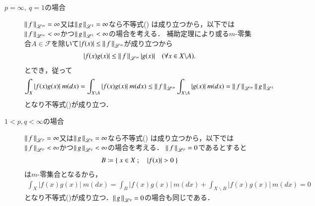 \begin{prf}
	\begin{description}
		\item[$p = \infty,\ q = 1$の場合]
			$\left\|\, f\, \right\|_{\mathscr{L}^\infty} = \infty$又は$\left\|\, g\, \right\|_{\mathscr{L}^1} = \infty$なら不等式()
			は成り立つから，以下では$\left\|\, f\, \right\|_{\mathscr{L}^\infty} < \infty$かつ$\left\|\, g\, \right\|_{\mathscr{L}^1} < \infty$の場合を考える．
			補助定理により或る$m$-零集合$A \in \mathcal{F}$を除いて$|f(x)| \leq \left\|\, f\, \right\|_{\mathscr{L}^\infty}$が成り立つから
			\begin{align}
				|f(x)g(x)| \leq \left\|\, f\, \right\|_{\mathscr{L}^\infty}|g(x)| \quad (\forall x \in X \backslash A).
			\end{align}
			とでき，従って
			\begin{align}
				\int_{X} |f(x)g(x)|\ m(dx) = \int_{X \backslash A} |f(x)g(x)|\ m(dx) \leq \left\|\, f\, \right\|_{\mathscr{L}^\infty} \int_{X \backslash A} |g(x)|\ m(dx) 
				= \left\|\, f\, \right\|_{\mathscr{L}^\infty} \left\|\, g\, \right\|_{\mathscr{L}^1}
			\end{align}
			となり不等式()が成り立つ．
		
		\item[$1 < p,q < \infty$の場合]
			$\left\|\, f\, \right\|_{\mathscr{L}^p} = \infty$又は$\left\|\, g\, \right\|_{\mathscr{L}^q} = \infty$なら不等式()
			は成り立つから，以下では$\left\|\, f\, \right\|_{\mathscr{L}^p} < \infty$かつ$\left\|\, g\, \right\|_{\mathscr{L}^q} < \infty$の場合を考える．
			$\left\|\, f\, \right\|_{\mathscr{L}^p} = 0$であるとすると
			\begin{align}
				B \coloneqq \left\{\ x \in X\ ;\quad |f(x)| > 0\ \right\}
			\end{align}
			は$m$-零集合となるから，
			\begin{align}
				\int_{X} |f(x)g(x)|\ m(dx) = \int_{B} |f(x)g(x)|\ m(dx) + \int_{X \backslash B} |f(x)g(x)|\ m(dx) = 0
			\end{align}
			となり不等式()が成り立つ．$\left\|\, g\, \right\|_{\mathscr{L}^q} = 0$の場合も同じである．
			

\end{description}
\end{prf}
